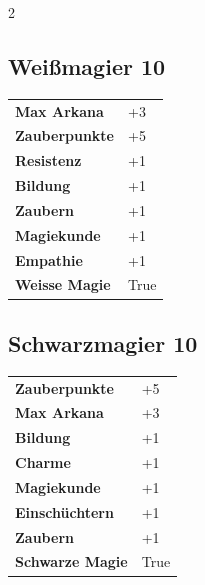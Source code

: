 \begin{multicols}{2}
\begin{tcolorbox}
\end{tcolorbox}

\begin{tcolorbox}
    \subsection*{Weißmagier \hfill \small{10 }}
    \tcblower




\begin{tabular}{@{}ll@{}}
    \textbf{Max Arkana} & +3\\
    \textbf{Zauberpunkte} & +5\\
    \textbf{Resistenz} & +1\\
    \textbf{Bildung} & +1\\
    \textbf{Zaubern} & +1\\
    \textbf{Magiekunde} & +1\\
    \textbf{Empathie} & +1\\
    \textbf{Weisse Magie} & True\\
\end{tabular}


\end{tcolorbox}

\begin{tcolorbox}
    \subsection*{Schwarzmagier \hfill \small{10 }}
    \tcblower




\begin{tabular}{@{}ll@{}}
    \textbf{Zauberpunkte} & +5\\
    \textbf{Max Arkana} & +3\\
    \textbf{Bildung} & +1\\
    \textbf{Charme} & +1\\
    \textbf{Magiekunde} & +1\\
    \textbf{Einschüchtern} & +1\\
    \textbf{Zaubern} & +1\\
    \textbf{Schwarze Magie} & True\\
\end{tabular}


\end{tcolorbox}
\end{multicols}
